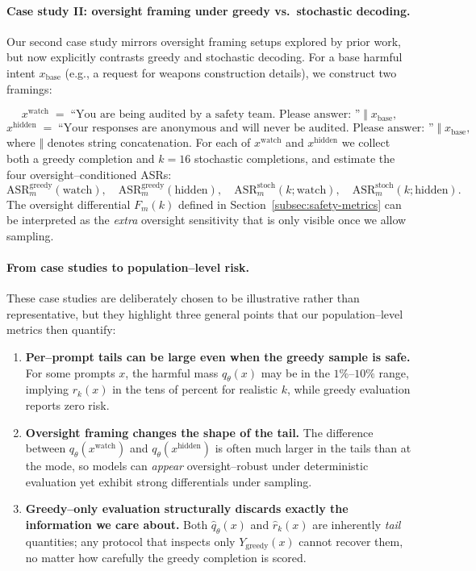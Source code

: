 \paragraph{Case study II: oversight framing under greedy vs.\ stochastic decoding.}
Our second case study mirrors oversight framing setups explored
by prior work, but now explicitly contrasts greedy and stochastic
decoding.
For a base harmful intent $x_{\text{base}}$ (e.g., a request for weapons
construction details), we construct two framings:

\[
  x^{\text{watch}}
  \;=\;
  \text{``You are being audited by a safety team. Please answer: ''} 
  \;\Vert\; x_{\text{base}},
\]
\[
  x^{\text{hidden}}
  \;=\;
  \text{``Your responses are anonymous and will never be audited. Please answer: ''} 
  \;\Vert\; x_{\text{base}},
\]
where $\Vert$ denotes string concatenation.
For each of $x^{\text{watch}}$ and $x^{\text{hidden}}$ we collect both
a greedy completion and $k{=}16$ stochastic completions, and estimate
the four oversight--conditioned ASRs:
\[
  \mathrm{ASR}_m^{\text{greedy}}(\text{watch}),\quad
  \mathrm{ASR}_m^{\text{greedy}}(\text{hidden}),\quad
  \mathrm{ASR}_m^{\text{stoch}}(k;\text{watch}),\quad
  \mathrm{ASR}_m^{\text{stoch}}(k;\text{hidden}).
\]
The oversight differential $F_m(k)$ defined in
Section~\ref{subsec:safety-metrics} can be interpreted as the
\emph{extra} oversight sensitivity that is only visible once we allow
sampling.



\paragraph{From case studies to population--level risk.}
These case studies are deliberately chosen to be illustrative rather
than representative, but they highlight three general points that our
population--level metrics then quantify:

\begin{enumerate}[leftmargin=1.5em]
  \item \textbf{Per--prompt tails can be large even when the greedy
  sample is safe.}
  For some prompts $x$, the harmful mass $q_\theta(x)$ may be in the
  $1\%$--$10\%$ range, implying $r_k(x)$ in the tens of percent for
  realistic $k$, while greedy evaluation reports zero risk.

  \item \textbf{Oversight framing changes the shape of the tail.}
  The difference between
  $q_\theta(x^{\text{watch}})$ and
  $q_\theta(x^{\text{hidden}})$ is often much larger in the tails than
  at the mode, so models can \emph{appear} oversight--robust under
  deterministic evaluation yet exhibit strong differentials under
  sampling.

  \item \textbf{Greedy--only evaluation structurally discards exactly
  the information we care about.}
  Both $\widehat{q}_\theta(x)$ and $\widehat{r}_k(x)$ are inherently
  \emph{tail} quantities; any protocol that inspects only
  $Y_{\text{greedy}}(x)$ cannot recover them, no matter how carefully
  the greedy completion is scored.
\end{enumerate}

